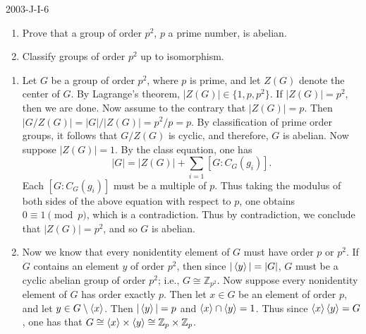 \documentclass{article}
\begin{document}
	\begin{prb}{2003-J-I-6}
		$ $\newline \vspace{-0.65cm}
		\begin{enumerate}[itemsep =-2pt,label = (\alph{*})]
			\item Prove that a group of order $p^{2}$, $p$ a prime number, is abelian. 
			\item Classify groups of order $p^{2}$ up to isomorphism. 
		\end{enumerate}
	\end{prb}
	\begin{enumerate}[itemsep =-2pt,label = (\alph{*})]
		\item Let $G$ be a group of order $p^{2}$, where $p$ is prime, and let $Z(G)$ denote the center of $G$. By Lagrange's theorem, $|Z(G)| \in \{1, p, p^{2}\}$. If $|Z(G)| = p^{2}$, then we are done. Now assume to the contrary that $|Z(G)| = p$. Then $|G/Z(G)| = |G|/|Z(G)| = p^{2}/p = p$. By classification of prime order groups, it follows that $G/Z(G)$ is cyclic, and therefore, $G$ is abelian. Now suppose $|Z(G)| = 1$. By the class equation, one has 
		\begin{equation*}
			|G| = |Z(G)| + \sum_{i = 1}[G: C_{G}(g_{i})]. 
		\end{equation*}
		Each $[G: C_{G}(g_{i})]$ must be a multiple of $p$. Thus taking the modulus of both sides of the above equation with respect to $p$, one obtains $0 \equiv 1 \pmod{p}$, which is a contradiction. Thus by contradiction, we conclude that $|Z(G)| = p^{2}$, and so $G$ is abelian. 
		\item Now we know that every nonidentity element of $G$ must have order $p$ or $p^{2}$. If $G$ contains an element $y$ of order $p^{2}$, then since $|\braket{y}| = |G|$, $G$ must be a cyclic abelian group of order $p^{2}$; i.e., $G \cong \mathbb{Z}_{p^{2}}$. Now suppose every nonidentity element of $G$ has order exactly $p$. Then let $x \in G$ be an element of order $p$, and let $y \in G \setminus \braket{x}$. Then $|\braket{y}| = p$ and $\braket{x} \cap \braket{y} = 1$. Thus since $\braket{x}\braket{y} = G$, one has that $G \cong \braket{x} \times \braket{y} \cong \mathbb{Z}_{p} \times \mathbb{Z}_{p}$. 
	\end{enumerate}
	
\end{document}
